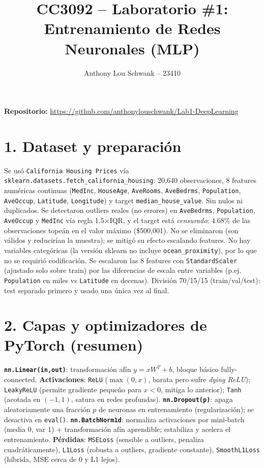 \documentclass[9pt]{extarticle}
\title{\vspace{-1.5cm}\large CC3092 -- Laboratorio \#1: Entrenamiento de Redes Neuronales (MLP)}
\author{Anthony Lou Schwank -- 23410}
\date{}
\begin{document}
\maketitle
\vspace{-0.9cm}

\textbf{Repositorio:} \url{https://github.com/anthonylouschwank/Lab1-DeepLearning}

\section*{1. Dataset y preparación}
Se usó \texttt{California Housing Prices} vía \texttt{sklearn.datasets.fetch\_california\_housing}: 20{,}640 observaciones, 8 features numéricas continuas (\texttt{MedInc}, \texttt{HouseAge}, \texttt{AveRooms}, \texttt{AveBedrms}, \texttt{Population}, \texttt{AveOccup}, \texttt{Latitude}, \texttt{Longitude}) y target \texttt{median\_house\_value}. Sin nulos ni duplicados. Se detectaron outliers reales (no errores) en \texttt{AveBedrms}, \texttt{Population}, \texttt{AveOccup} y \texttt{MedInc} vía regla 1.5$\times$IQR, y el target está \emph{censurado}: 4.68\% de las observaciones tope\'an en el valor máximo (\$500{,}001). No se eliminaron (son válidos y reducirían la muestra); se mitigó su efecto escalando features. No hay variables categóricas (la versión sklearn no incluye \texttt{ocean\_proximity}), por lo que no se requirió codificación. Se escalaron las 8 features con \texttt{StandardScaler} (ajustado solo sobre train) por las diferencias de escala entre variables (p.ej. \texttt{Population} en miles vs \texttt{Latitude} en decenas). División 70/15/15 (train/val/test): test separado primero y usado una única vez al final.

\section*{2. Capas y optimizadores de PyTorch (resumen)}
\textbf{\texttt{nn.Linear(in,out)}}: transformación afín $y=xW^T+b$, bloque básico fully-connected. \textbf{Activaciones}: \texttt{ReLU} ($\max(0,x)$, barata pero sufre \emph{dying ReLU}); \texttt{LeakyReLU} (permite gradiente pequeño para $x<0$, mitiga lo anterior); \texttt{Tanh} (acotada en $(-1,1)$, satura en redes profundas). \textbf{\texttt{nn.Dropout(p)}}: apaga aleatoriamente una fracción $p$ de neuronas en entrenamiento (regularización); se desactiva en \texttt{eval()}. \textbf{\texttt{nn.BatchNorm1d}}: normaliza activaciones por mini-batch (media 0, var 1) + transformación afín aprendible; estabiliza y acelera el entrenamiento. \textbf{Pérdidas}: \texttt{MSELoss} (sensible a outliers, penaliza cuadráticamente), \texttt{L1Loss} (robusta a outliers, gradiente constante), \texttt{SmoothL1Loss} (híbrida, MSE cerca de 0 y L1 lejos).
\end{document}

